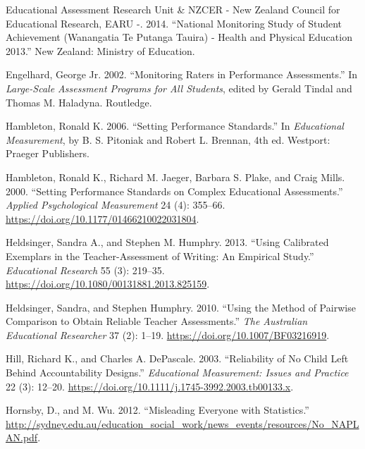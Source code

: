 \documentclass[
  letterpaper,
]{report}
\newlength{\cslhangindent}
\newlength{\cslentryspacingunit} %
\newenvironment{CSLReferences}[2] %
 {%
  \setlength{\parindent}{0pt}
  \ifodd #1
  \let\oldpar\par
  \def\par{\hangindent=\cslhangindent\oldpar}
  \fi
  \setlength{\parskip}{#2\cslentryspacingunit}
 }%
 {}
\begin{document}
\begin{CSLReferences}{1}{0}
\leavevmode{}%
Educational Assessment Research Unit \& NZCER - New Zealand Council for
Educational Research, EARU -. 2014. {``National {Monitoring Study} of
{Student Achievement} ({Wanangatia} Te Putanga Tauira) - {Health} and
{Physical Education} 2013.''} {New Zealand}: {Ministry of Education}.

\leavevmode{}%
Engelhard, George Jr. 2002. {``Monitoring {Raters} in {Performance
Assessments}.''} In \emph{Large-Scale {Assessment Programs} for {All
Students}}, edited by Gerald Tindal and Thomas M. Haladyna. {Routledge}.

\leavevmode{}%
Hambleton, Ronald K. 2006. {``Setting {Performance Standards}.''} In
\emph{Educational {Measurement}}, by B. S. Pitoniak and Robert L.
Brennan, 4th ed. {Westport}: {Praeger Publishers}.

\leavevmode{}%
Hambleton, Ronald K., Richard M. Jaeger, Barbara S. Plake, and Craig
Mills. 2000. {``Setting {Performance Standards} on {Complex Educational
Assessments}.''} \emph{Applied Psychological Measurement} 24 (4):
355--66. \url{https://doi.org/10.1177/01466210022031804}.

\leavevmode{}%
Heldsinger, Sandra A., and Stephen M. Humphry. 2013. {``Using Calibrated
Exemplars in the Teacher-Assessment of Writing: An Empirical Study.''}
\emph{Educational Research} 55 (3): 219--35.
\url{https://doi.org/10.1080/00131881.2013.825159}.

\leavevmode{}%
Heldsinger, Sandra, and Stephen Humphry. 2010. {``Using the Method of
Pairwise Comparison to Obtain Reliable Teacher Assessments.''} \emph{The
Australian Educational Researcher} 37 (2): 1--19.
\url{https://doi.org/10.1007/BF03216919}.

\leavevmode{}%
Hill, Richard K., and Charles A. DePascale. 2003. {``Reliability of {No
Child Left Behind Accountability Designs}.''} \emph{Educational
Measurement: Issues and Practice} 22 (3): 12--20.
\url{https://doi.org/10.1111/j.1745-3992.2003.tb00133.x}.

\leavevmode{}%
Hornsby, D., and M. Wu. 2012. {``Misleading Everyone with Statistics.''}
\url{http://sydney.edu.au/education_social_work/news_events/resources/No_NAPLAN.pdf}.


\end{CSLReferences}
\end{document}
